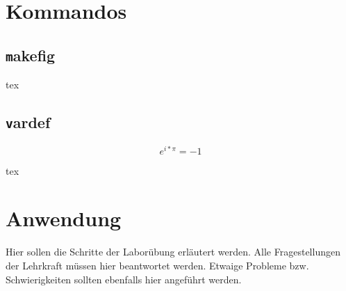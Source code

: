 \newpage
\section{Kommandos}\label{sec:Kommandos}
\subsection{\texttt makefig}

\begin{listing}
\begin{code}{tex}
\end{code}
\caption{\texttt makefig}
\label{lst:makefig}
\end{listing}

\subsection{\texttt vardef}
\begin{listing}
\begin{code}{tex}
$$e^{i*\pi} = -1$$}
\end{code}

$$e^{i*\pi} = -1$$

\begin{code}[firstnumber=last]{tex}
\begin{vardef}
\end{vardef}
\end{code}

\begin{vardef}
\end{vardef}

\caption{\texttt vardef}
\label{lst:vardef}
\end{listing}

\newpage
\section{Anwendung}\label{sec:Anwendung}
Hier sollen die Schritte der Laborübung erläutert werden. Alle Fragestellungen der Lehrkraft müssen hier beantwortet werden. Etwaige Probleme bzw. Schwierigkeiten sollten ebenfalls hier angeführt werden.


